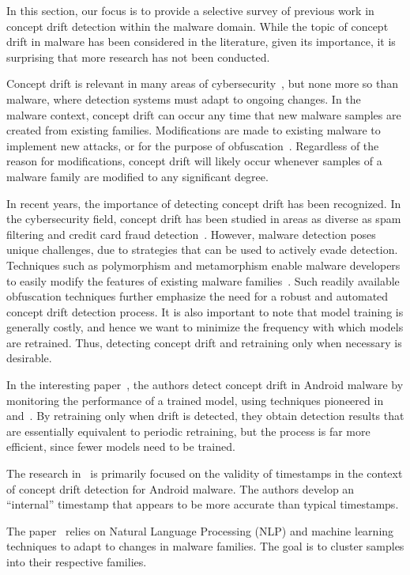 \documentclass[12pt]{article}
\begin{document}
In this section, our focus is to provide a selective survey of previous work in concept drift detection 
within the malware domain. While the topic of concept drift in malware has been considered in the 
literature, given its importance, it is surprising that more research has not been conducted.

Concept drift is relevant in many areas of cybersecurity~\cite{9027485}, but none more so than 
malware, where detection systems must adapt to ongoing changes. In the malware context,
concept drift can occur any time that new malware samples are created from existing families. 
Modifications are made to existing malware to implement new attacks, or for the 
purpose of obfuscation~\cite{10.1145/2381896.2381910}. Regardless of the reason for modifications,
concept drift will likely occur whenever samples of a malware family are 
modified to any significant degree. 

In recent years, the importance of detecting concept drift has been recognized. In the cybersecurity field, 
concept drift has been studied in areas as diverse as spam filtering and credit card fraud detection~\cite{Jog}. 
However, malware detection poses unique challenges, due to strategies that can be used to actively 
evade detection. Techniques such as polymorphism and metamorphism enable malware developers
to easily modify the features of existing malware families~\cite{Sharma_2014}. Such 
readily available obfuscation techniques further emphasize the need for a robust and automated 
concept drift detection process. It is also important to note that model training is generally
costly, and hence we want to minimize the frequency with which models are retrained.
Thus, detecting concept drift and retraining only when necessary is desirable.

In the interesting paper~\cite{Molina}, the authors detect concept drift in Android 
malware by monitoring the performance of a trained model, using techniques pioneered 
in~\cite{Page} and~\cite{Hinckley}. By retraining only when drift is detected,
they obtain detection results that are essentially equivalent to periodic retraining,
but the process is far more efficient, since fewer models need to be trained.

The research in~\cite{Alejandro} is primarily focused on the validity of timestamps in
the context of concept drift detection for Android malware. The authors develop 
an ``internal'' timestamp that appears to be more accurate than 
typical timestamps.

The paper~\cite{Karbab} relies on Natural Language Processing (NLP)
and machine learning techniques to adapt to changes in malware families. 
The goal is to cluster samples into their respective families.
\end{document}
